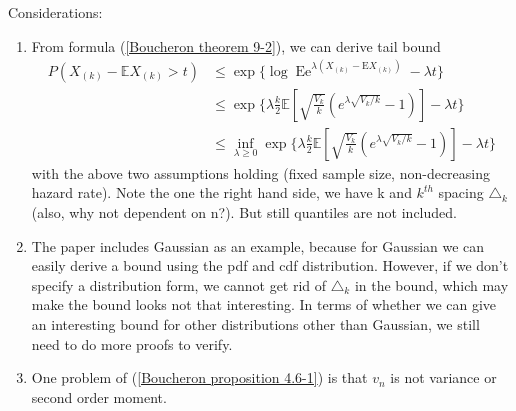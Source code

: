 \documentclass{article}
\begin{document}
Considerations:
\begin{enumerate}
    \item From formula (\ref{Boucheron theorem 9-2}), we can derive tail bound 
    \begin{align}
        P(X_{(k)} - \mathbb{E}X_{(k)} > t) &\leq \exp\{\log \operatorname{Ee}^{\lambda\left(X_{(k)}-\mathrm{E} X_{(k)}\right)} - \lambda t \}\\
        &\leq \exp \{\lambda \frac{k}{2} \mathbb{E}\left[\sqrt{\frac{V_{k}}{k}}\left(e^{\lambda \sqrt{V_{k} / k}}-1\right)\right] - \lambda t\}\\
        &\leq \inf_{\lambda \geq 0} \exp \{\lambda \frac{k}{2} \mathbb{E}\left[\sqrt{\frac{V_{k}}{k}}\left(e^{\lambda \sqrt{V_{k} / k}}-1\right)\right] - \lambda t\}
    \end{align}
    with the above two assumptions holding (fixed sample size, non-decreasing hazard rate). Note the one the right hand side, we have k and $k^{th}$ spacing $\triangle_k$ (also, why not dependent on n?). But still quantiles are not included.
    
    \item The paper includes Gaussian as an example, because for Gaussian we can easily derive a bound using the pdf and cdf distribution. However, if we don't specify a distribution form, we cannot get rid of $\triangle_k$ in the bound, which may make the bound looks not that interesting. In terms of whether we can give an interesting bound for other distributions other than Gaussian, we still need to do more proofs to verify.  
    
    \item One problem of (\ref{Boucheron proposition 4.6-1}) is that $v_n$ is not variance or second order moment. 
\end{enumerate}
\printbibliography
\end{document}
